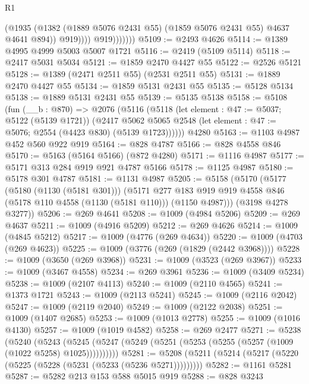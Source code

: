 \begin{lexlean}{R1}
\begin{coremodule}
                          (@1935
                            (@1382
                              (@1889 @5076 @2431 @55)
                              (@1859 @5076 @2431 @55)
                              @4637
                              @4641
                              @894))
                          @919))))
                  @919)))))))
@5109 := @2493 @4626
@5114 := @1389 @4995 @4999 @5003 @5007 @1721
@5116 := @2419 (@5109 @5114)
@5118 := @2417 @5031 @5034
@5121 := @1859 @2470 @4427 @55
@5122 := @2526 @5121
@5128 := @1389 (@2471 @2511 @55) (@2531 @2511 @55)
@5131 := @1889 @2470 @4427 @55
@5134 := @1859 @5131 @2431 @55
@5135 := @5128 @5134
@5138 := @1889 @5131 @2431 @55
@5139 := @5135 @5138
@5158 := @5108
    (fun (__b : @870) =>
    @2076
      (@5116
        (@5118
          (let element : @47 := @5037; @5122 (@5139 @1721))
          (@2417
            @5062
            @5065
            @2548
            (let element : @47 := @5076; @2554 (@4423 @830) (@5139 @1723))))))
    @4280
@5163 := @1103 @4987 @452 @560 @922 @919
@5164 := @828 @4787
@5166 := @828 @4558 @846
@5170 := @5163 (@5164 @5166) (@872 @4280)
@5171 := @1116 @4987
@5177 := @5171 @313 @284 @919 @921 @4787 @5166
@5178 := @1125 @4987
@5180 := @5178 @301 @4787
@5181 := @1131 @4987
@5205 := @5158
    (@5170
      (@5177
        (@5180 (@1130 (@5181 @301)))
        (@5171
          @277
          @183
          @919
          @919
          @4558
          @846
          (@5178 @110 @4558 (@1130 (@5181 @110)))
          (@1150 @4987)))
      (@3198 @4278 @3277))
@5206 := @269 @4641
@5208 := @1009 (@4984 @5206)
@5209 := @269 @4637
@5211 := @1009 (@4916 @5209)
@5212 := @269 @4626
@5214 := @1009 (@4845 @5212)
@5217 := @1009 (@4776 (@269 @4634))
@5220 := @1009 (@4703 (@269 @4623))
@5225 := @1009 (@3776 (@269 (@1829 (@2442 @3968))))
@5228 := @1009 (@3650 (@269 @3968))
@5231 := @1009 (@3523 (@269 @3967))
@5233 := @1009 (@3467 @4558)
@5234 := @269 @3961
@5236 := @1009 (@3409 @5234)
@5238 := @1009 (@2107 @4113)
@5240 := @1009 (@2110 @4565)
@5241 := @1373 @1721
@5243 := @1009 (@2113 @5241)
@5245 := @1009 (@2116 @2042)
@5247 := @1009 (@2119 @2040)
@5249 := @1009 (@2122 @2038)
@5251 := @1009 (@1407 @2685)
@5253 := @1009 (@1013 @2778)
@5255 := @1009 (@1016 @4130)
@5257 := @1009 (@1019 @4582)
@5258 := @269 @2477
@5271 := @5238
    (@5240
      (@5243 (@5245 (@5247 (@5249 (@5251 (@5253 (@5255 (@5257 (@1009 (@1022 @5258) @1025))))))))))
@5281 := @5208 (@5211 (@5214 (@5217 (@5220 (@5225 (@5228 (@5231 (@5233 (@5236 @5271)))))))))
@5282 := @1161 @5281
@5287 := @5282 @213 @153 @588 @5015 @919
@5288 := @828 @3243

\end{coremodule}
\end{lexlean}
